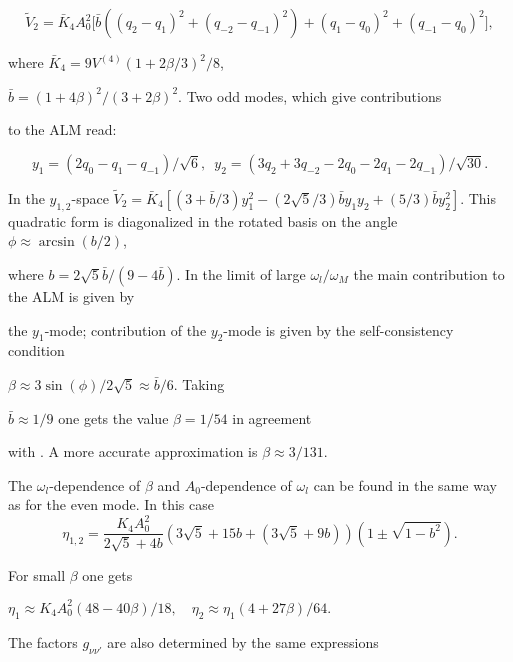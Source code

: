 $$ 

\tilde{V}_2 = \bar{K}_4 A_0^2 {\Big [}

\bar{b}((q_2-q_1)^2 + (q_{-2} - q_{-1})^2) +  

(q_1-q_0)^2 + (q_{-1} -q_0)^2{\Big ]}, 

$$ 

where $\bar{K}_4=9V^{(4)}(1+2\beta/3)^2/8$, 

$\bar{b}=(1+4\beta)^2/(3+2\beta)^2$. Two odd modes, which give contributions 

to the ALM read: 

$$ 

y_1=(2q_0 -q_1-q_{-1})/\sqrt{6},\,\,\, 

y_2=(3q_2 + 3q_{-2} - 2q_0 - 2q_1- 2q_{-1})/\sqrt{30}. 

$$ 

In the $y_{1,2}$-space  $\tilde{V}_2 = \bar{K}_4 [(3+\bar{b}/3)y_1^2 -  

(2\sqrt{5}/3)\bar{b} y_1 y_2 + (5/3) \bar{b} y_2^2]$. This quadratic form 
is 
diagonalized in the rotated basis on the angle $\phi \approx
 \arcsin{(b/2)}$,

where $b = 2\sqrt{5}\bar{b}/(9-4\bar{b})$. In the limit
 of large $\omega_l/\omega_M$ the main contribution to the ALM is given by

the $y_1$-mode; contribution of the $y_2$-mode is given by the 
self-consistency
 condition 

$\beta \approx 3\sin{(\phi)}/ 2\sqrt{5} \approx \bar{b}/6$. Taking 

$\bar{b} \approx 1/9$ one gets the value $\beta = 1/54$ in agreement 

with \cite{page}. A more 
accurate approximation is $\beta \approx 3/131$.


The $\omega_l$-dependence of $\beta$ and $A_0$-dependence of 
$\omega_l$ can be found in the same way 
as for the even mode. In this case
$$

\eta_{1,2} = \frac{K_4A_0^2}{2\sqrt{5} + 4b} (3\sqrt{5} +15 b + 

(3\sqrt{5} + 9 b))(1 \pm \sqrt{1-b^2}).

$$

For small $\beta$ one gets

$

\eta_1 \approx K_4A_0^2 (48 - 40\beta)/18,

\quad \eta_2 \approx \eta_1 (4+ 27 \beta)/64.

$

The factors $g_{\nu \nu'}$ are also determined by the same expressions 

